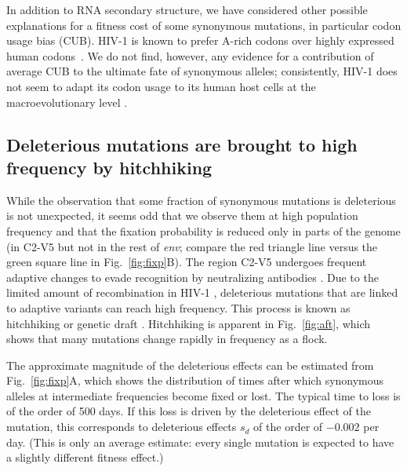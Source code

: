 \documentclass[10pt]{article}
\newcommand{\FIG}[1]{Fig.~\ref{fig:#1}}
\newcommand{\env}{\textit{env}}
\newcommand{\shankaregion}{C2-V5}
\begin{document}
In addition to RNA secondary structure, we have considered other possible
explanations for a fitness cost of some synonymous mutations, in particular codon
usage bias (CUB). HIV-1 is known to prefer A-rich codons over highly expressed
human codons~\cite{jenkins_extent_2003,kuyl_biased_2012}. We do not find,
however, any evidence for a contribution of average CUB to the ultimate fate of
synonymous alleles; consistently, HIV-1 does not seem to adapt its codon usage to
its human host cells at the macroevolutionary level \cite{kuyl_biased_2012}.

\subsection*{Deleterious mutations are brought to high frequency by hitchhiking}

While the observation that some fraction of synonymous mutations is deleterious
is not unexpected, it seems odd that we observe them at high population
frequency and that the fixation probability is reduced only in parts of the
genome (in \shankaregion{} but not in the rest of \env{}; compare the red
triangle line versus the green square line in \FIG{fixp}B).
The region \shankaregion{} undergoes frequent adaptive changes to evade
recognition by neutralizing antibodies \cite{williamson_adaptation_2003,
richman_rapid_2003}. Due to the limited amount of recombination in HIV-1
\cite{neher_recombination_2010, batorsky_estimate_2011}, deleterious mutations
that are linked to adaptive variants can reach high frequency. This process is
known as hitchhiking \cite{smith_hitch-hiking_1974} or genetic draft
\cite{gillespie_genetic_2000,neher_genetic_2011}. Hitchhiking is  apparent in
\FIG{aft}, which shows that many mutations change rapidly in frequency as a
flock. 

The approximate magnitude of the deleterious effects can be estimated from
\FIG{fixp}A, which shows the distribution of times after which synonymous
alleles at intermediate frequencies become fixed or lost. The typical time to
loss is of the order of 500 days. If this loss is driven by the deleterious
effect of the mutation, this corresponds to deleterious effects $s_d$ of the
order of $- 0.002$ per day. (This is only an average estimate: every single
mutation is expected to have a slightly different fitness effect.)
\end{document}

